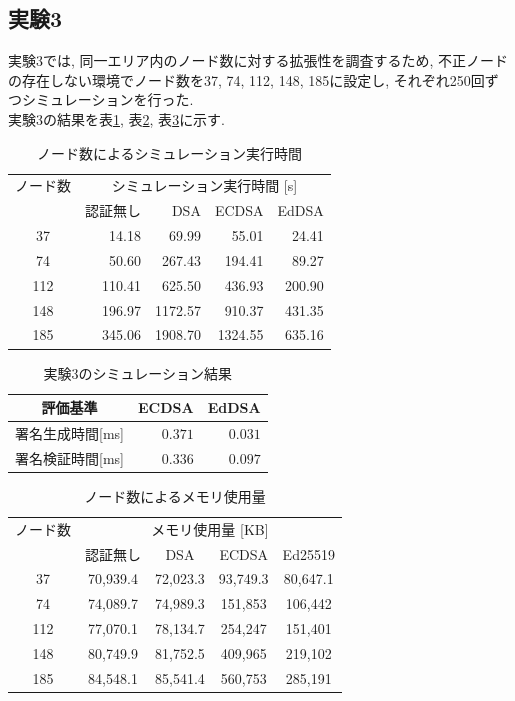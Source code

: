 \documentclass[a4j,9pt,twocolumn]{jsarticle}
\begin{document}
\subsection{実験3}
\indent 実験3では, 同一エリア内のノード数に対する拡張性を調査するため, 
不正ノードの存在しない環境でノード数を37, 74, 112, 148, 185に設定し, 
それぞれ250回ずつシミュレーションを行った. \\
\indent 実験3の結果を表\ref{tab:exp3_simtime}, 表\ref{tab:exp3_sig}, 
表\ref{tab:exp3_memory}に示す. 
\begin{table}[h]
    \centering
    \caption{ノード数によるシミュレーション実行時間}
    \label{tab:exp3_simtime}
    \begin{tabular}{c|rrrr} \hline
        ノード数 & \multicolumn{4}{c}{シミュレーション実行時間 [s]} \\ \cline{2-5}
                       & 認証無し & DSA & ECDSA & EdDSA \\ \hline \hline
        37  &  14.18  &   69.99  &   55.01  &   24.41  \\
        74  &  50.60  &  267.43  &  194.41  &   89.27  \\
        112 & 110.41  &  625.50  &  436.93  &  200.90  \\
        148 & 196.97  & 1172.57  &  910.37  &  431.35  \\
        185 & 345.06  & 1908.70  & 1324.55  &  635.16  \\ \hline
    \end{tabular}
\end{table}
\vspace{-5mm}
\begin{table}[h]
    \centering
    \caption{実験3のシミュレーション結果}
    \label{tab:exp3_sig} 
    \begin{tabular}{c|rr} \hline
        評価基準 & ECDSA & EdDSA \\ \hline \hline
        署名生成時間[ms] & $0.371$ & $0.031$ \\
        署名検証時間[ms] & $0.336$ & $0.097$ \\ \hline
    \end{tabular}
\end{table}
\vspace{-5mm}
\begin{table}[h]
    \centering
    \caption{ノード数によるメモリ使用量}
    \label{tab:exp3_memory}
    \begin{tabular}{c|cccc} \hline
        ノード数 & \multicolumn{4}{c}{メモリ使用量 [KB]} \\ \cline{2-5}
                       & 認証無し & DSA & ECDSA & Ed25519 \\ \hline \hline
        37  &  70,939.4  &  72,023.3  &   93,749.3  &   80,647.1  \\
        74  &  74,089.7  &  74,989.3  &  151,853  &  106,442  \\
        112 &  77,070.1  &  78,134.7  &  254,247  &  151,401  \\
        148 &  80,749.9  &  81,752.5  &  409,965  &  219,102  \\
        185 &  84,548.1  &  85,541.4  &  560,753  &  285,191  \\ \hline
    \end{tabular}
\end{table}
\end{document}
